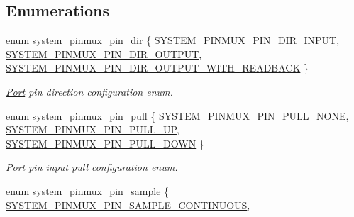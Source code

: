 \subsection*{Enumerations}
\begin{DoxyCompactItemize}
\item 
enum \hyperlink{group__asfdoc__sam0__system__pinmux__group_gaef5ed797ec6ce6e7f2ca4bafd3f77df2}{system\+\_\+pinmux\+\_\+pin\+\_\+dir} \{ \hyperlink{group__asfdoc__sam0__system__pinmux__group_ggaef5ed797ec6ce6e7f2ca4bafd3f77df2ae9eec757570dd8e703060cd249076f29}{S\+Y\+S\+T\+E\+M\+\_\+\+P\+I\+N\+M\+U\+X\+\_\+\+P\+I\+N\+\_\+\+D\+I\+R\+\_\+\+I\+N\+P\+U\+T}, 
\hyperlink{group__asfdoc__sam0__system__pinmux__group_ggaef5ed797ec6ce6e7f2ca4bafd3f77df2ab20cb484d8d81cea0eccd85608636f8a}{S\+Y\+S\+T\+E\+M\+\_\+\+P\+I\+N\+M\+U\+X\+\_\+\+P\+I\+N\+\_\+\+D\+I\+R\+\_\+\+O\+U\+T\+P\+U\+T}, 
\hyperlink{group__asfdoc__sam0__system__pinmux__group_ggaef5ed797ec6ce6e7f2ca4bafd3f77df2ae7f0fe12708b38583366e7f09c37f413}{S\+Y\+S\+T\+E\+M\+\_\+\+P\+I\+N\+M\+U\+X\+\_\+\+P\+I\+N\+\_\+\+D\+I\+R\+\_\+\+O\+U\+T\+P\+U\+T\+\_\+\+W\+I\+T\+H\+\_\+\+R\+E\+A\+D\+B\+A\+C\+K}
 \}
\begin{DoxyCompactList}\small\item\em \hyperlink{struct_port}{Port} pin direction configuration enum. \end{DoxyCompactList}\item 
enum \hyperlink{group__asfdoc__sam0__system__pinmux__group_ga936e823e4b08dc981d39c273182eb1c6}{system\+\_\+pinmux\+\_\+pin\+\_\+pull} \{ \hyperlink{group__asfdoc__sam0__system__pinmux__group_gga936e823e4b08dc981d39c273182eb1c6a6de6c84525642ff68da72bc3dd5fad4b}{S\+Y\+S\+T\+E\+M\+\_\+\+P\+I\+N\+M\+U\+X\+\_\+\+P\+I\+N\+\_\+\+P\+U\+L\+L\+\_\+\+N\+O\+N\+E}, 
\hyperlink{group__asfdoc__sam0__system__pinmux__group_gga936e823e4b08dc981d39c273182eb1c6ac9fa59589685abc00e18426750100e35}{S\+Y\+S\+T\+E\+M\+\_\+\+P\+I\+N\+M\+U\+X\+\_\+\+P\+I\+N\+\_\+\+P\+U\+L\+L\+\_\+\+U\+P}, 
\hyperlink{group__asfdoc__sam0__system__pinmux__group_gga936e823e4b08dc981d39c273182eb1c6a0dec6136103bdccb64576c9bf431ae41}{S\+Y\+S\+T\+E\+M\+\_\+\+P\+I\+N\+M\+U\+X\+\_\+\+P\+I\+N\+\_\+\+P\+U\+L\+L\+\_\+\+D\+O\+W\+N}
 \}
\begin{DoxyCompactList}\small\item\em \hyperlink{struct_port}{Port} pin input pull configuration enum. \end{DoxyCompactList}\item 
enum \hyperlink{group__asfdoc__sam0__system__pinmux__group_gac0c5f124b2d0deed3751156f20135994}{system\+\_\+pinmux\+\_\+pin\+\_\+sample} \{ \hyperlink{group__asfdoc__sam0__system__pinmux__group_ggac0c5f124b2d0deed3751156f20135994ac6a9b047d924787a9bd6df78eb92bf36}{S\+Y\+S\+T\+E\+M\+\_\+\+P\+I\+N\+M\+U\+X\+\_\+\+P\+I\+N\+\_\+\+S\+A\+M\+P\+L\+E\+\_\+\+C\+O\+N\+T\+I\+N\+U\+O\+U\+S}, 

\end{DoxyCompactItemize}
